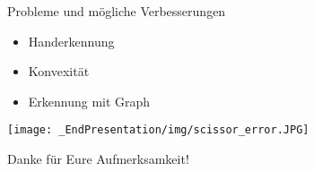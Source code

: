 \documentclass[aspectratio=169]{beamer}
\begin{document}
\begin{frame}{Probleme und mögliche Verbesserungen}
\begin{minipage}{0.45\textwidth}
\begin{itemize}
    \item Handerkennung
    \item Konvexität
    \item Erkennung mit Graph
\end{itemize}
\end{minipage} \begin{minipage}{0.5\textwidth}
    \texttt{[image: \_EndPresentation/img/scissor\_error.JPG]}
\end{minipage}


\end{frame}


 \begin{frame}{}
     \centering
     \huge Danke für Eure Aufmerksamkeit!
 \end{frame}
\end{document}
